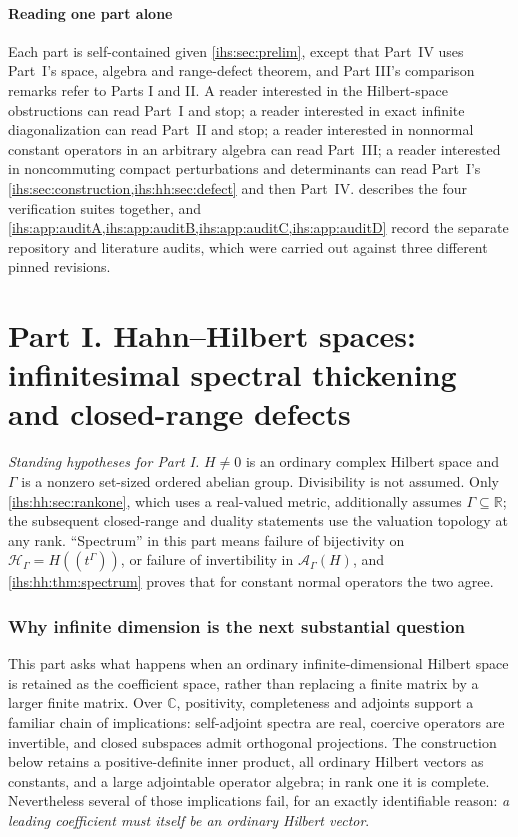\documentclass[11pt,a4paper]{article}
\numberwithin{equation}{section}
\theoremstyle{definition}
\theoremstyle{remark}
\newcommand{\C}{\mathbb C}
\newcommand{\R}{\mathbb R}
\newcommand{\Hil}{\mathcal H_\Gamma}
\newcommand{\Ahh}{\mathcal A_\Gamma(H)}
\begin{document}
\subsection{Reading one part alone}\label{ihs:sec:readingalone}
Each part is self-contained given \cref{ihs:sec:prelim}, except that Part~IV
uses Part~I's space, algebra and range-defect theorem, and Part III's
comparison remarks refer to Parts I and II. A reader interested in the
Hilbert-space obstructions can read Part~I and stop; a reader interested in
exact infinite diagonalization can read Part~II and stop; a reader
interested in nonnormal constant operators in an arbitrary algebra can read
Part~III; a reader interested in noncommuting compact perturbations and
determinants can read Part~I's \cref{ihs:sec:construction,ihs:hh:sec:defect}
and then Part~IV.  describes the four verification
suites together, and
\cref{ihs:app:auditA,ihs:app:auditB,ihs:app:auditC,ihs:app:auditD} record
the separate repository and literature audits, which were carried out
against three different pinned revisions.

\clearpage
\part*{Part I. Hahn--Hilbert spaces: infinitesimal spectral thickening and closed-range defects}

\emph{Standing hypotheses for Part I.} $H\ne0$ is an ordinary complex
Hilbert space and $\Gamma$ is a nonzero set-sized ordered abelian group.
Divisibility is not assumed. Only \cref{ihs:hh:sec:rankone}, which uses a
real-valued metric, additionally assumes $\Gamma\subseteq\R$; the subsequent
closed-range and duality statements use the valuation topology at any rank. ``Spectrum'' in this part means failure
of bijectivity on $\Hil=H((t^\Gamma))$, or failure of invertibility in
$\Ahh$, and \cref{ihs:hh:thm:spectrum} proves that for constant normal
operators the two agree.

\section{Why infinite dimension is the next substantial question}\label{ihs:hh:sec:why}

This part asks what happens when an ordinary infinite-dimensional Hilbert
space is retained as the coefficient space, rather than replacing a finite
matrix by a larger finite matrix. Over $\C$, positivity, completeness and
adjoints support a familiar chain of implications: self-adjoint spectra are
real, coercive operators are invertible, and closed subspaces admit
orthogonal projections. The construction below retains a positive-definite
inner product, all ordinary Hilbert vectors as constants, and a large
adjointable operator algebra; in rank one it is complete. Nevertheless
several of those implications fail, for an exactly identifiable reason:
\emph{a leading coefficient must itself be an ordinary Hilbert vector}.
\end{document}
